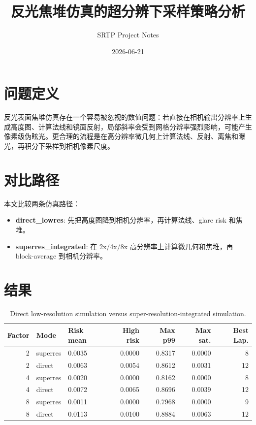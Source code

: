 \documentclass[11pt,a4paper]{ctexart}
\title{反光焦堆仿真的超分辨下采样策略分析}
\author{SRTP Project Notes}
\date{2026-06-21}
\begin{document}
\maketitle

\section{问题定义}

反光表面焦堆仿真存在一个容易被忽视的数值问题：若直接在相机输出分辨率上生成高度图、计算法线和镜面反射，局部斜率会受到网格分辨率强烈影响，可能产生像素级伪眩光。更合理的流程是在高分辨率微几何上计算法线、反射、离焦和曝光，再积分下采样到相机像素尺度。

\section{对比路径}

本文比较两条仿真路径：

\begin{itemize}
  \item \textbf{direct\_lowres}: 先把高度图降到相机分辨率，再计算法线、glare risk 和焦堆。
  \item \textbf{superres\_integrated}: 在 2x/4x/8x 高分辨率上计算微几何和焦堆，再 block-average 到相机分辨率。
\end{itemize}

\section{结果}

\begin{table}[htbp]
\centering
\small
\begin{tabular}{rllrrrr}
\toprule
Factor & Mode & Risk mean & High risk & Max p99 & Max sat. & Best Lap. \\
\midrule
2 & superres & 0.0035 & 0.0000 & 0.8317 & 0.0000 & 8 \\
2 & direct & 0.0063 & 0.0054 & 0.8612 & 0.0031 & 12 \\
4 & superres & 0.0020 & 0.0000 & 0.8162 & 0.0000 & 8 \\
4 & direct & 0.0072 & 0.0065 & 0.8696 & 0.0039 & 12 \\
8 & superres & 0.0011 & 0.0000 & 0.7968 & 0.0000 & 9 \\
8 & direct & 0.0113 & 0.0100 & 0.8884 & 0.0063 & 12 \\
\bottomrule
\end{tabular}
\caption{Direct low-resolution simulation versus super-resolution-integrated simulation.}
\end{table}
\end{document}
